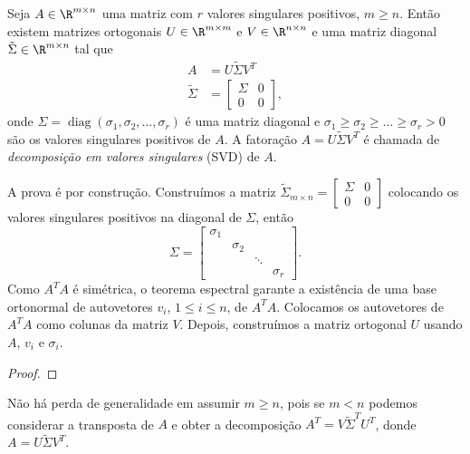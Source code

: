 \documentclass{article}
\DeclareMathOperator{\diag}{diag}
\begin{document}
\begin{thm} \label{thm:svd}
    Seja \(A \in \R^{m \times n}\) uma matriz com \(r\) valores singulares positivos, \(m \geq n\). Então existem matrizes ortogonais \(U \in \R^{m \times m}\) e \(V \in \R^{n \times n}\) e uma matriz diagonal \(\tilde{\Sigma} \in \R^{m \times n}\) tal que
    \begin{align}
        A &= U \tilde{\Sigma} V^T \\
        \tilde{\Sigma} &= \begin{bmatrix}
            \Sigma & 0 \\
            0 & 0
        \end{bmatrix},
    \end{align} onde \(\Sigma = \diag(\sigma_1, \sigma_2, \ldots, \sigma_r)\) é uma matriz diagonal e \(\sigma_1 \geq \sigma_2 \geq \ldots \geq \sigma_r > 0\) são os valores singulares positivos de \(A\). A fatoração \(A = U \tilde{\Sigma} V^T\) é chamada de \emph{decomposição em valores singulares} (SVD) de \(A\).
\end{thm}

A prova é por construção. Construímos a matriz \(\tilde{\Sigma}_{m \times n} = \begin{bmatrix}
    \Sigma & 0 \\
    0 & 0
\end{bmatrix}\) colocando os valores singulares positivos na diagonal de \(\Sigma\), então \[\Sigma = \begin{bmatrix}
    \sigma_1 & & & \\
    & \sigma_2 & & \\
    & & \ddots & \\
    & & & \sigma_r
\end{bmatrix}.
\] 
Como \(A^TA\) é simétrica, o teorema espectral garante a existência de uma base ortonormal de autovetores \(v_i\), \(1 \leq i \leq n\), de \(A^TA\). Colocamos os autovetores de \(A^TA\) como colunas da matriz \(V\). Depois, construímos a matriz ortogonal \(U\) usando \(A\), \(v_i\) e \(\sigma_i\).

\begin{proof}
    
\end{proof}

\begin{rem}
    Não há perda de generalidade em assumir \(m \geq n\), pois se \(m < n\) podemos considerar a transposta de \(A\) e obter a decomposição \(A^T = V \tilde{\Sigma}^T U^T\), donde \(A = U \tilde{\Sigma} V^T\).
\end{rem}
\end{document}
